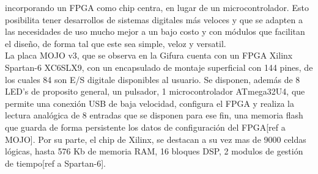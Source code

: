 incorporando un FPGA como chip centra, en lugar de un microcontrolador. Esto posibilita tener desarrollos de sistemas digitales más veloces y que se adapten a las necesidades de uso mucho mejor a un 
bajo costo y con módulos que facilitan el diseño, de forma tal que este sea simple, veloz y versatil.\\
	La placa MOJO v3, que se observa en la Gifura %
cuenta con un FPGA Xilinx Spartan-6 XC6SLX9, con un encapsulado de montaje superficial con 144 pines, de los cuales 84 son E/S digitale disponibles al usuario. Se disponen, 
además de 8 LED's de proposito general, un pulsador, 1 microcontrolador ATmega32U4, que permite una conexión USB de baja velocidad, configura el FPGA y realiza la lectura analógica de 8 entradas que se 
disponen para ese fin, una memoria flash que guarda de forma persistente los datos de configuración del FPGA[ref a MOJO]. Por su parte, el chip de Xilinx, se destacan a su vez mas de 9000 celdas 
lógicas, hasta 576 Kb de memoria RAM, 16 bloques DSP, 2 modulos de gestión de tiempo[ref a Spartan-6].\\
	


